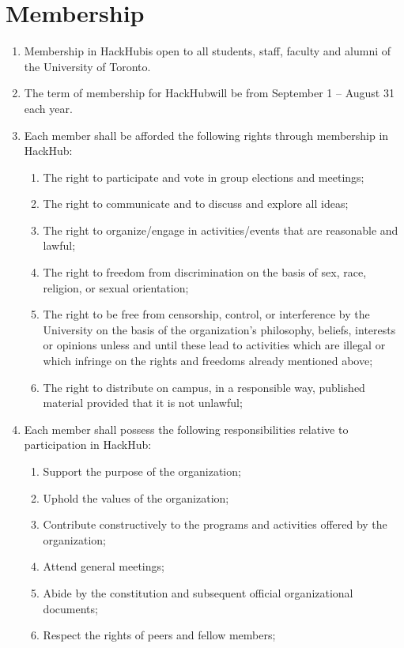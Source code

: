 \documentclass[12pt]{article}
\newcommand{\orgname}{HackHub\space}
\begin{document}
\section{Membership}
\begin{enumerate}[{3}.1]
    \item Membership in \orgname is open to all students, staff, faculty and alumni of the University of Toronto.
    \item The term of membership for \orgname will be from September 1 – August 31 each year.
    \item Each member shall be afforded the following rights through membership in \orgname: 
    \begin{enumerate}[{3.3}.1]
        \item	The right to participate and vote in group elections and meetings;
        \item	The right to communicate and to discuss and explore all ideas;
        \item	The right to organize/engage in activities/events that are reasonable and lawful;
        \item	The right to freedom from discrimination on the basis of sex, race, religion, or sexual orientation;
        \item	The right to be free from censorship, control, or interference by the University on the basis of the organization’s philosophy, beliefs, interests or opinions unless and until these lead to activities which are illegal or which infringe on the rights and freedoms already mentioned above;
        \item	The right to distribute on campus, in a responsible way, published material provided that it is not unlawful;
    \end{enumerate}
    \item Each member shall possess the following responsibilities relative to participation in \orgname: 
    \begin{enumerate}[{3.4}.1]
        \item	Support the purpose of the organization; 
        \item	Uphold the values of the organization;
        \item	Contribute constructively to the programs and activities offered by the organization; 
        \item	Attend general meetings; 
        \item	Abide by the constitution and subsequent official organizational documents;
        \item	Respect the rights of peers and fellow members;

\end{enumerate}
\end{enumerate}
\end{document}
